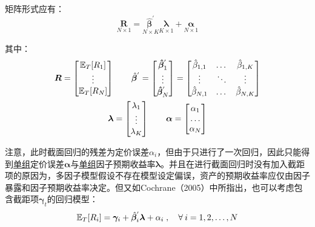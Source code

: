 \documentclass[11pt]{article}
\begin{document}
矩阵形式应有：
\begin{equation*}
    \underset{N \times 1}{\bm{R}} = \underset{N \times K}{\hat{\bm{\beta}}^{'}} \underset{ K \times 1}{\bm{\lambda}} + \underset{N \times 1}{\bm{\alpha}}
\end{equation*}

其中：
\begin{gather*}
    \bm{R} = \begin{bmatrix} \mathbb{E}_T[R_1] \\ \vdots \\ \mathbb{E}_T[R_N] \end{bmatrix}
    \qquad
    \hat{\bm{\beta}}^{'}
    = \begin{bmatrix} \bm{\hat{\beta}}_{1}^{'} \\ \vdots \\ \bm{\hat{\beta}}_{N}^{'} \end{bmatrix}
    = \begin{bmatrix} \hat{\beta}_{1,1} & \dots & \hat{\beta}_{1,K} \\ \vdots & \ddots & \vdots \\ \hat{\beta}_{N,1} & \dots & \hat{\beta}_{N,K} \end{bmatrix}
    \\
    \bm{\lambda} = \begin{bmatrix} \lambda_{1} \\ \vdots \\ \lambda_{K} \end{bmatrix}
    \qquad
    \bm{\alpha} = \begin{bmatrix} \alpha_1 \\ \dots \\ \alpha_N \end{bmatrix}
\end{gather*}

注意，此时截面回归的残差为定价误差$\alpha_i$，但由于只进行了一次回归，因此只能得到\uline{单组}定价误差$\bm{\alpha}$与\uline{单组}因子预期收益率$\bm{\lambda}$。并且在进行截面回归时没有加入截距项的原因为，多因子模型假设不存在模型设定偏误，资产的预期收益率应仅由因子暴露和因子预期收益率决定。但又如Cochrane（2005）中所指出，也可以考虑包含截距项$\bm{\gamma}_t$的回归模型：
\begin{equation*}
    \E_T[R_{i}] = \bm{\gamma}_i + \hat{\bm{\beta}}_{i}^{'} \bm{\lambda} + \alpha_{i} \inlinesep \forall i=1,2,\dots,N
\end{equation*}
\end{document}
